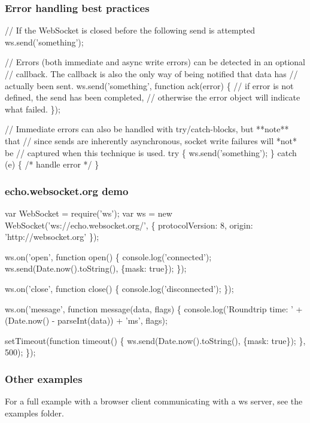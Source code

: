 \subsubsection*{Error handling best practices}


\begin{DoxyCode}
// If the WebSocket is closed before the following send is attempted
ws.send('something');

// Errors (both immediate and async write errors) can be detected in an optional
// callback. The callback is also the only way of being notified that data has
// actually been sent.
ws.send('something', function ack(error) \{
  // if error is not defined, the send has been completed,
  // otherwise the error object will indicate what failed.
\});

// Immediate errors can also be handled with try/catch-blocks, but **note** that
// since sends are inherently asynchronous, socket write failures will *not* be
// captured when this technique is used.
try \{ ws.send('something'); \}
catch (e) \{ /* handle error */ \}
\end{DoxyCode}


\subsubsection*{echo.\+websocket.\+org demo}


\begin{DoxyCode}
var WebSocket = require('ws');
var ws = new WebSocket('ws://echo.websocket.org/', \{
  protocolVersion: 8,
  origin: 'http://websocket.org'
\});

ws.on('open', function open() \{
  console.log('connected');
  ws.send(Date.now().toString(), \{mask: true\});
\});

ws.on('close', function close() \{
  console.log('disconnected');
\});

ws.on('message', function message(data, flags) \{
  console.log('Roundtrip time: ' + (Date.now() - parseInt(data)) + 'ms', flags);

  setTimeout(function timeout() \{
    ws.send(Date.now().toString(), \{mask: true\});
  \}, 500);
\});
\end{DoxyCode}


\subsubsection*{Other examples}

For a full example with a browser client communicating with a ws server, see the examples folder.

